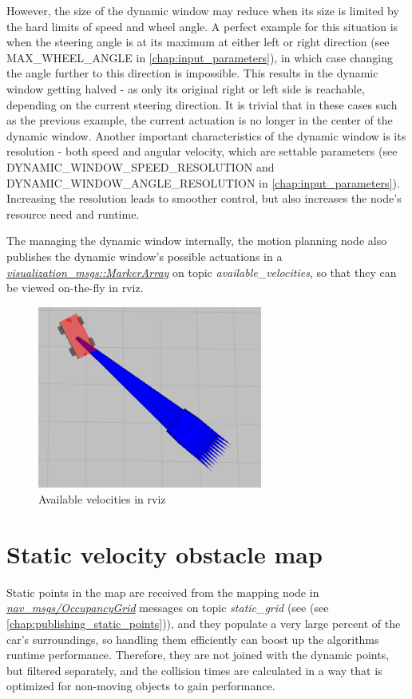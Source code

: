 However, the size of the dynamic window may reduce when its size is limited by the hard limits of speed and wheel angle. A perfect example for this situation is when the steering angle is at its maximum at either left or right direction (see MAX\_WHEEL\_ANGLE in \ref{chap:input_parameters}), in which case changing the angle further to this direction is impossible. This results in the dynamic window getting halved - as only its original right or left side is reachable, depending on the current steering direction. It is trivial that in these cases such as the previous example, the current actuation is no longer in the center of the dynamic window.
Another important characteristics of the dynamic window is its resolution - both speed and angular velocity, which are settable parameters (see DYNAMIC\_WINDOW\_SPEED\_RESOLUTION and DYNAMIC\_WINDOW\_ANGLE\_RESOLUTION in \ref{chap:input_parameters}). Increasing the resolution leads to smoother control, but also increases the node's resource need and runtime.

The managing the dynamic window internally, the motion planning node also publishes the dynamic window's possible actuations in a \href{http://docs.ros.org/melodic/api/visualization_msgs/html/msg/MarkerArray.html}{\textit{visualization\_msgs::MarkerArray}} on topic \textit{available\_velocities}, so that they can be viewed on-the-fly in rviz.

\begin{figure}[!ht]
    \centering
    \includegraphics[height=60mm]{figures/raw/rviz_available_velocities.png}
    \caption{Available velocities in rviz}
    \label{rviz_available_velocities}
\end{figure}

\section{Static velocity obstacle map}
\label{chap:static_velocity_obstacle_map}
Static points in the map are received from the mapping node in \href{http://docs.ros.org/melodic/api/nav_msgs/html/msg/OccupancyGrid.html}{\textit{nav\_msgs/OccupancyGrid}} messages on topic \textit{static\_grid} (see (see \ref{chap:publishing_static_points})), and they populate a very large percent of the car's surroundings, so handling them efficiently can boost up the algorithms runtime performance. Therefore, they are not joined with the dynamic points, but filtered separately, and the collision times are calculated in a way that is optimized for non-moving objects to gain performance.


